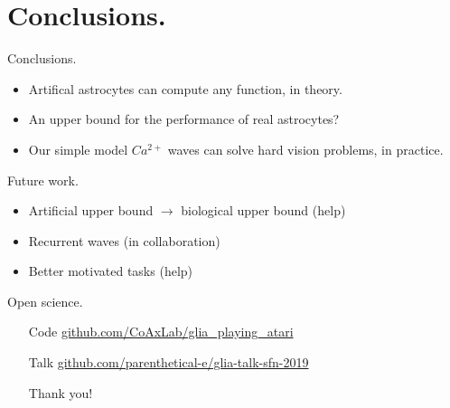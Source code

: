 \documentclass[10pt]{beamer}
\begin{document}
\section[Conclusions.]{Conclusions.}
\begin{frame}[fragile]{Conclusions.}
\begin{itemize}
\item Artifical astrocytes can compute any function, in theory.
\item An \alert{upper bound} for the performance of real astrocytes? 
\item Our simple model $Ca^{2+}$ waves can solve hard vision problems, in practice.
\end{itemize}
\end{frame}

\begin{frame}[fragile]{Future work.}
\begin{itemize}
\item Artificial upper bound $\rightarrow$ biological upper bound (\alert{help})
\item Recurrent waves (in collaboration)
\item Better motivated tasks (\alert{help})
\end{itemize}
\end{frame}

\begin{frame}[fragile]{Open science.}
\begin{itemize}
\item[Code] \url{github.com/CoAxLab/glia_playing_atari}
\item[Talk] \url{github.com/parenthetical-e/glia-talk-sfn-2019}
\item[] 
\item[] \alert{Thank you!}
\end{itemize}
\end{frame}


%   
%   

\end{document}
